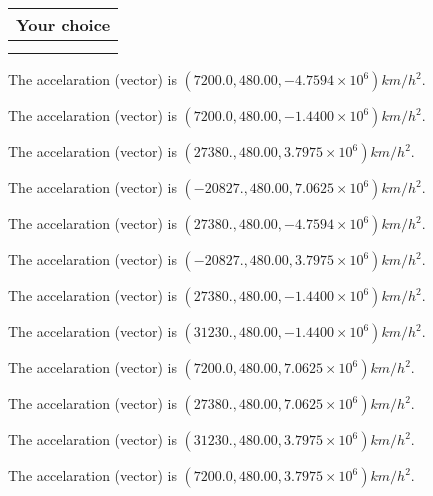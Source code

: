 \documentclass[12pt]{article}
\begin{document}
  
  
\noindent\hspace{3.0in} \begin{tabular}{|l|}
\hline
Your choice \\
\hline
 \\ 
 \\ 
\hline
\end{tabular}
  
  
 
 
The accelaration (vector) is
$(
7200.0,
480.00 ,
-4.7594 \times 10^{6}
)km/h^2.
$
 
 
The accelaration (vector) is
$(
7200.0,
480.00 ,
-1.4400 \times 10^{6}
)km/h^2.
$
 
 
The accelaration (vector) is
$(
27380.,
480.00 ,
3.7975 \times 10^{6}
)km/h^2.
$
 
 
The accelaration (vector) is
$(
-20827.,
480.00 ,
7.0625 \times 10^{6}
)km/h^2.
$
 
 
The accelaration (vector) is
$(
27380.,
480.00 ,
-4.7594 \times 10^{6}
)km/h^2.
$
 
 
The accelaration (vector) is
$(
-20827.,
480.00 ,
3.7975 \times 10^{6}
)km/h^2.
$
 
 
The accelaration (vector) is
$(
27380.,
480.00 ,
-1.4400 \times 10^{6}
)km/h^2.
$
 
 
The accelaration (vector) is
$(
31230.,
480.00 ,
-1.4400 \times 10^{6}
)km/h^2.
$
 
 
The accelaration (vector) is
$(
7200.0,
480.00 ,
7.0625 \times 10^{6}
)km/h^2.
$
 
 
The accelaration (vector) is
$(
27380.,
480.00 ,
7.0625 \times 10^{6}
)km/h^2.
$
 
 
The accelaration (vector) is
$(
31230.,
480.00 ,
3.7975 \times 10^{6}
)km/h^2.
$
 
 
The accelaration (vector) is
$(
7200.0,
480.00 ,
3.7975 \times 10^{6}
)km/h^2.
$
 
 
 
 

 
 
\vspace{0.3in}
   
\end{document}
